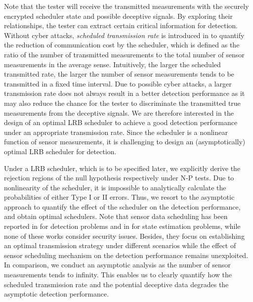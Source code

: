 \documentclass[journal]{IEEEtran}
\begin{document}
Note that the tester will receive the transmitted measurements with the securely encrypted scheduler state  and possible deceptive signals. By exploring their relationships, the tester can extract certain critical information for detection. Without cyber attacks, {\em scheduled transmission rate} is introduced in \cite{you2013asymptotically} to quantify the reduction of communication cost by the scheduler, which is defined as the ratio of the number of transmitted measurements to the total number of sensor measurements in the average sense. Intuitively, the larger the scheduled transmitted rate, the larger the number of sensor measurements tends to be transmitted in a fixed time interval. Due to possible cyber attacks, a larger transmission rate does not always result in a better detection performance as it may also reduce the chance for the tester to discriminate the transmitted true measurements from the deceptive signals. We are therefore interested in the design of an optimal LRB scheduler to achieve a good detection performance under an appropriate transmission rate.  Since the scheduler is a nonlinear function of sensor measurements, it is challenging to design an (asymptotically) optimal LRB scheduler for detection.





Under a LRB scheduler, which is to be specified later, we explicitly derive the rejection regions of the null hypothesis respectively under N-P tests. Due to nonlinearity of the scheduler, it is impossible to analytically calculate the probabilities of either Type I or II errors. Thus, we resort to the asymptotic approach  to quantify the effect of the scheduler on the detection performance, and obtain optimal schedulers.  Note that sensor data scheduling  has been reported in \cite{rago1996censoring,appadwedula2005energy,appadwedula2008decentralized,maleki2011energy,ding2014likelihood} for detection problems and in \cite{shi2011optimal,shi2011sensor,wu2013event,you2013asymptotically} for state estimation problems, while none of these works consider security issues. Besides, they focus on establishing an optimal transmission strategy under different scenarios while the effect of sensor scheduling mechanism on the detection performance remains unexploited. In comparison, we conduct an asymptotic analysis as the number of sensor measurements tends to infinity. This enables us to clearly quantify how the scheduled transmission rate and the potential deceptive data degrades the asymptotic detection performance.
\end{document}

